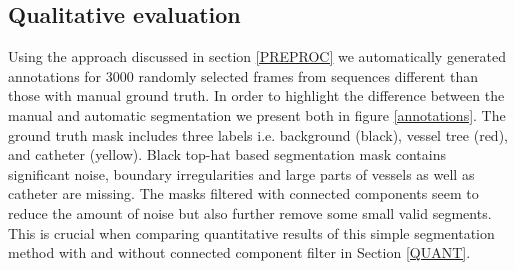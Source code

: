 \documentclass{bmvc2k}
\begin{document}
\subsection{Qualitative evaluation}\label{QUAL}
Using the approach discussed in section \ref{PREPROC} we automatically generated annotations for  3000 randomly selected frames from sequences different than those with manual ground truth. 
In order to highlight the difference between the  manual and automatic segmentation we present both in figure \ref{annotations}. The ground truth mask includes three labels i.e. background (black), vessel tree (red), and catheter (yellow). Black top-hat based segmentation mask contains significant noise, boundary irregularities and large parts of vessels as well as catheter are missing. The masks filtered with connected components seem to reduce the amount of noise but also further remove some small valid segments. This is crucial when comparing quantitative results of this simple segmentation method with and without connected component filter in Section \ref{QUANT}.  
\end{document}
